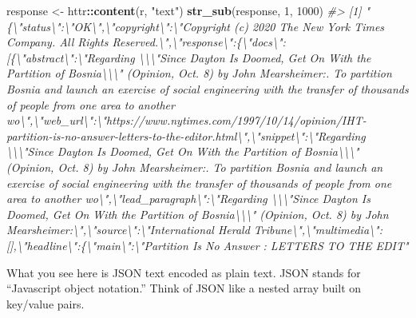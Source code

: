 \documentclass[
]{book}
\newenvironment{Shaded}{\begin{snugshade}}{\end{snugshade}}
\newcommand{\CommentTok}[1]{\textcolor[rgb]{0.56,0.35,0.01}{\textit{#1}}}
\newcommand{\DecValTok}[1]{\textcolor[rgb]{0.00,0.00,0.81}{#1}}
\newcommand{\KeywordTok}[1]{\textcolor[rgb]{0.13,0.29,0.53}{\textbf{#1}}}
\newcommand{\NormalTok}[1]{#1}
\newcommand{\OperatorTok}[1]{\textcolor[rgb]{0.81,0.36,0.00}{\textbf{#1}}}
\newcommand{\StringTok}[1]{\textcolor[rgb]{0.31,0.60,0.02}{#1}}
\begin{document}
\begin{Shaded}
\begin{Highlighting}[]
\NormalTok{response <-}\StringTok{ }\NormalTok{httr}\OperatorTok{::}\KeywordTok{content}\NormalTok{(r, }\StringTok{"text"}\NormalTok{)}
\KeywordTok{str_sub}\NormalTok{(response, }\DecValTok{1}\NormalTok{, }\DecValTok{1000}\NormalTok{)}
\CommentTok{#> [1] "\{\textbackslash{}"status\textbackslash{}":\textbackslash{}"OK\textbackslash{}",\textbackslash{}"copyright\textbackslash{}":\textbackslash{}"Copyright (c) 2020 The New York Times Company. All Rights Reserved.\textbackslash{}",\textbackslash{}"response\textbackslash{}":\{\textbackslash{}"docs\textbackslash{}":[\{\textbackslash{}"abstract\textbackslash{}":\textbackslash{}"Regarding \textbackslash{}\textbackslash{}\textbackslash{}"Since Dayton Is Doomed, Get On With the Partition of Bosnia\textbackslash{}\textbackslash{}\textbackslash{}" (Opinion, Oct. 8) by John Mearsheimer:. To partition Bosnia and launch an exercise of social engineering with the transfer of thousands of people from one area to another wo\textbackslash{}",\textbackslash{}"web_url\textbackslash{}":\textbackslash{}"https://www.nytimes.com/1997/10/14/opinion/IHT-partition-is-no-answer-letters-to-the-editor.html\textbackslash{}",\textbackslash{}"snippet\textbackslash{}":\textbackslash{}"Regarding \textbackslash{}\textbackslash{}\textbackslash{}"Since Dayton Is Doomed, Get On With the Partition of Bosnia\textbackslash{}\textbackslash{}\textbackslash{}" (Opinion, Oct. 8) by John Mearsheimer:. To partition Bosnia and launch an exercise of social engineering with the transfer of thousands of people from one area to another wo\textbackslash{}",\textbackslash{}"lead_paragraph\textbackslash{}":\textbackslash{}"Regarding \textbackslash{}\textbackslash{}\textbackslash{}"Since Dayton Is Doomed, Get On With the Partition of Bosnia\textbackslash{}\textbackslash{}\textbackslash{}" (Opinion, Oct. 8) by John Mearsheimer:\textbackslash{}",\textbackslash{}"source\textbackslash{}":\textbackslash{}"International Herald Tribune\textbackslash{}",\textbackslash{}"multimedia\textbackslash{}":[],\textbackslash{}"headline\textbackslash{}":\{\textbackslash{}"main\textbackslash{}":\textbackslash{}"Partition Is No Answer : LETTERS TO THE EDIT"}
\end{Highlighting}
\end{Shaded}

What you see here is JSON text encoded as plain text. JSON stands for ``Javascript object notation.'' Think of JSON like a nested array built on key/value pairs.
\end{document}
